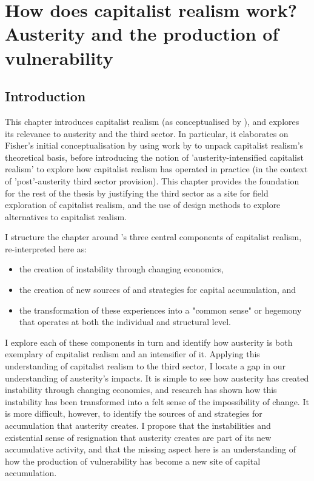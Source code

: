 \chapter{How does capitalist realism work? Austerity and the production of vulnerability}
\label{ch:2}

\section{Introduction}
\label{sec:2-intro}

This chapter introduces capitalist realism (as conceptualised by \citet{fisher_capitalist_2009}), and explores its relevance to austerity and the third sector. In particular, it elaborates on Fisher's initial conceptualisation by using work by \citet{shonkwiler_reading_2014} to unpack capitalist realism's theoretical basis, before introducing the notion of 'austerity-intensified capitalist realism' to explore how capitalist realism has operated in practice (in the context of 'post'-austerity third sector provision). This chapter provides the foundation for the rest of the thesis by justifying the third sector as a site for field exploration of capitalist realism, and the use of design methods to explore alternatives to capitalist realism. 

I structure the chapter around \citet{shonkwiler_reading_2014}'s three central components of capitalist realism, re-interpreted here as:
\begin{itemize}
    \item         the creation of instability through changing economics, 
    \item the creation of new sources of and strategies for capital accumulation, and 
    \item the transformation of these experiences into a "common sense" or hegemony that operates at both the individual and structural level. 
\end{itemize}

I explore each of these components in turn and identify how austerity is both exemplary of capitalist realism and an intensifier of it. Applying this understanding of capitalist realism to the third sector, I locate a gap in our understanding of austerity's impacts. It is simple to see how austerity has created instability through changing economics, and research has shown how this instability has been transformed into a felt sense of the impossibility of change. It is more difficult, however, to identify the sources of and strategies for accumulation that austerity creates. I propose that the instabilities and existential sense of resignation that austerity creates are part of its new accumulative activity, and that the missing aspect here is an understanding of how the production of vulnerability has become a new site of capital accumulation.

